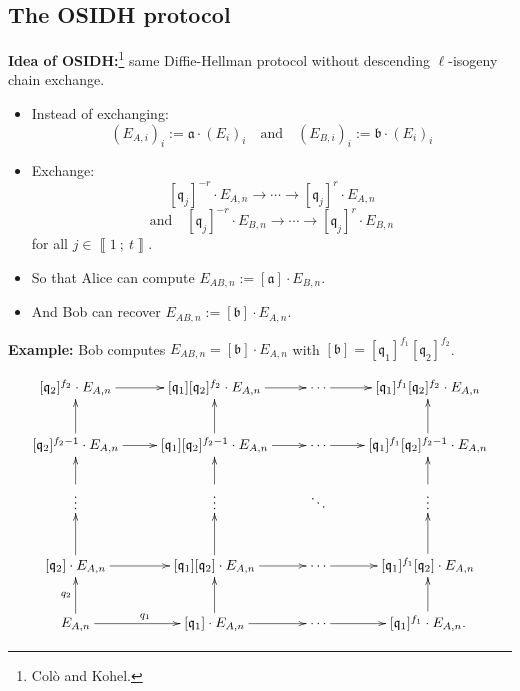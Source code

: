 \documentclass[10pt]{beamer}
\theoremstyle{plain}
\theoremstyle{definition}
\newcommand{\mO}{\mathcal{O}}
\renewcommand{\i}[2]{\left\llbracket #1~;~#2\right\rrbracket}
\renewcommand{\(}{\left(}
\renewcommand{\)}{\right)}
\newcommand{\mf}[1]{\mathfrak{#1}}
\newcommand{\mfq}{\mathfrak{q}}
\begin{document}



\subsection{The OSIDH protocol}

\begin{frame}
\textbf{Idea of OSIDH:}\footnote[frame]{Col\`{o} and Kohel.} same Diffie-Hellman protocol without descending $\ell$-isogeny chain exchange.

\vspace{0.5cm}

\begin{itemize}
\item Instead of exchanging:
\[(E_{A,i})_{i}:=\mf{a}\cdot (E_i)_{i} \quad \mbox{and} \quad (E_{B,i})_{i}:=\mf{b}\cdot (E_i)_{i}\]

\pause 
\item Exchange:
\[[\mfq_j]^{-r}\cdot E_{A,n}\longrightarrow \cdots\longrightarrow [\mfq_j]^{r}\cdot E_{A,n}\]
\[\mbox{and} \quad [\mfq_j]^{-r}\cdot E_{B,n}\longrightarrow \cdots\longrightarrow [\mfq_j]^{r}\cdot E_{B,n}\]
for all $j\in\i{1}{t}$.

\pause
\item So that Alice can compute $E_{AB,n}:=[\mf{a}]\cdot E_{B,n}$.
\item And Bob can recover $E_{AB,n}:=[\mf{b}]\cdot E_{A,n}$.
\end{itemize}

\end{frame}

\begin{frame}
\textbf{Example:} Bob computes $E_{AB,n}=[\mf{b}]\cdot E_{A,n}$ with $[\mf{b}]=[\mf{q}_1]^{f_1}[\mf{q}_2]^{f_2}$.

\[\xymatrix{
[\mf{q}_2]^{f_2}\cdot E_{A,n}  \ar[r] & [\mf{q}_1][\mf{q}_2]^{f_2}\cdot E_{A,n} \ar[r] & \cdots \ar[r] & [\mf{q}_1]^{f_1}[\mf{q}_2]^{f_2}\cdot E_{A,n}\\
[\mf{q}_2]^{f_2-1}\cdot E_{A,n}  \ar[u] \ar[r] & [\mf{q}_1][\mf{q}_2]^{f_2-1}\cdot E_{A,n} \ar[u] \ar[r] & \cdots \ar[r] & [\mf{q}_1]^{f_1}[\mf{q}_2]^{f_2-1}\cdot E_{A,n}\ar[u]\\
\vdots \ar[u] & \vdots \ar[u] & \ddots & \vdots \ar[u]\\
[\mf{q}_2]\cdot E_{A,n}  \ar[u] \ar[r] & [\mf{q}_1][\mf{q}_2]\cdot E_{A,n} \ar[u]\ar[r] & \cdots \ar[r] & [\mf{q}_1]^{f_1}[\mf{q}_2]\cdot E_{A,n} \ar[u] \\
E_{A,n} \ar[u]^{q_2} \ar[r]^{q_1} & [\mf{q}_1]\cdot E_{A,n} \ar[u] \ar[r] & \cdots  \ar[r] & [\mf{q}_1]^{f_1}\cdot E_{A,n}. \ar[u]
}\]

\end{frame}
\end{document}
